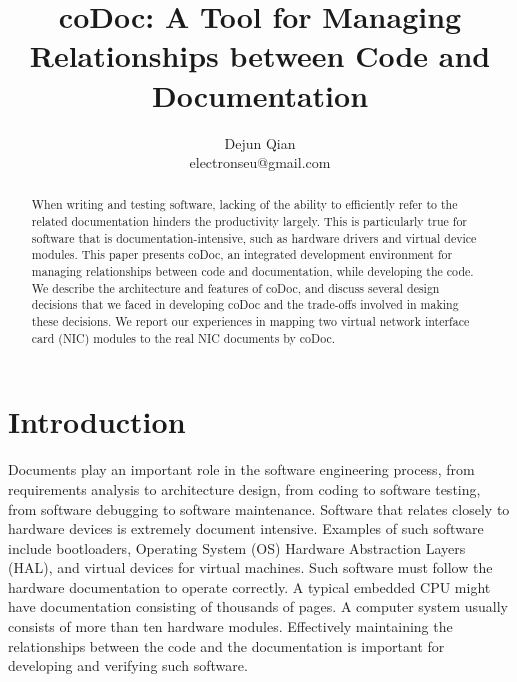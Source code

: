 \documentclass[11pt,letterpaper,oneside]{article}
\title{coDoc: A Tool for Managing Relationships between Code and Documentation}
\author{Dejun Qian\\electronseu@gmail.com}
\date{}
\begin{document}
\maketitle

\begin{abstract}
When writing and testing software, 
lacking of the ability to efficiently refer to the related documentation hinders the productivity largely.
This is particularly true for software that is documentation-intensive, 
such as hardware drivers and virtual device modules.
This paper presents coDoc, 
an integrated development environment for managing relationships between code and documentation, while developing the code. 
We describe the architecture and features of coDoc,
and discuss several design decisions that we faced in developing coDoc and the trade-offs involved in making these decisions.
We report our experiences in mapping two virtual network interface card (NIC) modules to the real NIC documents by coDoc.
\end{abstract}


\section{Introduction}
\label{sec:introduction}
Documents play an important role in the software engineering process,
from requirements analysis to architecture design,
from coding to software testing,
from software debugging to software maintenance.
Software that relates closely to hardware devices is extremely document intensive. %
Examples of such software include bootloaders, 
Operating System (OS) Hardware Abstraction Layers (HAL),
and virtual devices for virtual machines.
Such software must follow the hardware documentation to operate correctly.
A typical embedded CPU might have documentation consisting of thousands of pages.
A computer system usually consists of more than ten hardware modules.
Effectively maintaining the relationships between the code and the documentation is important for developing and verifying such software. %
\end{document}
